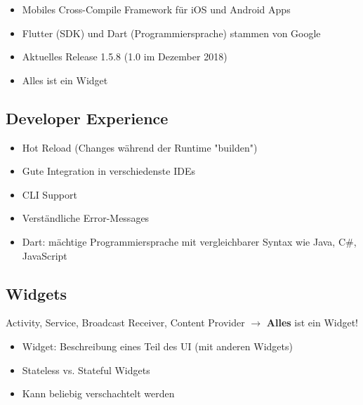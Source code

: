 \documentclass[a4paper]{article}
\begin{document}
{	\begin{itemize}
		
		\item Mobiles Cross-Compile Framework für iOS und Android Apps
		
		\item Flutter (SDK) und Dart (Programmiersprache) stammen von Google
		
		\item Aktuelles Release 1.5.8 (1.0 im Dezember 2018)
		
		\item Alles ist ein Widget
		
	\end{itemize}

	\subsection{Developer Experience}
	
	\begin{itemize}
		
		\item Hot Reload (Changes während der Runtime "builden")
		
		\item Gute Integration in verschiedenste IDEs
		
		\item CLI Support
		
		\item Verständliche Error-Messages
		
		\item Dart: mächtige Programmiersprache mit vergleichbarer Syntax wie Java, C\#, JavaScript
		
	\end{itemize}

	\subsection{Widgets}
	
	Activity, Service, Broadcast Receiver, Content Provider $\rightarrow$ \textbf{Alles} ist ein Widget!

	\begin{itemize}
		
		\item Widget: Beschreibung eines Teil des UI (mit anderen Widgets)
		
		\item Stateless vs. Stateful Widgets
		
		\item Kann beliebig verschachtelt werden
		

\end{itemize}}
\end{document}
